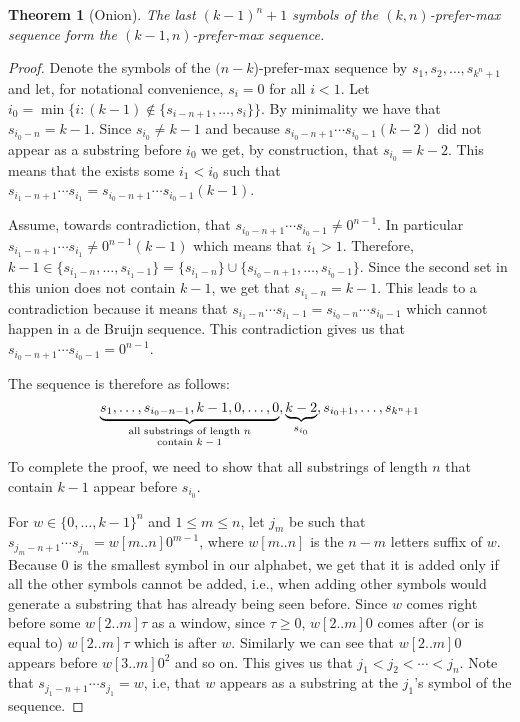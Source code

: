 \documentclass{article}
\newtheorem{theorem}{Theorem}
\theoremstyle{definition}
\begin{document}
\begin{theorem}[Onion]
	The last $(k-1)^n+1$ symbols of the $(k,n)$-prefer-max sequence form the $(k-1,n)$-prefer-max sequence.
\end{theorem}
\begin{proof}
	Denote the symbols of the $(n-k$)-prefer-max sequence by $s_1,s_2,\dots,s_{k^n+1}$ and let, for notational convenience, $s_i=0$ for all $i<1$. Let ${i_0} = \min\bigl\{i\colon (k-1) \notin \{s_{i-n+1},\dots,s_{i}\}\bigr\}$. 
	By minimality we have that $s_{{i_0}-n}=k-1$. Since $s_{i_0} \neq k-1$ and because $s_{{i_0}-n+1}\cdots s_{{i_0}-1} (k-2)$ did not appear as a substring before ${i_0}$ we get, by construction, that $s_{{i_0}}=k-2$. This means that the exists some ${i_1}<{i_0}$ such that $s_{{i_1}-n+1}\cdots s_{{i_1}} = s_{{i_0}-n+1}\cdots s_{{i_0}-1}(k-1)$.
	
	Assume, towards contradiction, that $s_{{i_0}-n+1}\cdots s_{{i_0}-1} \neq 0^{n-1}$. In particular $s_{{i_1}-n+1}\cdots s_{{i_1}} \neq 0^{n-1}(k-1)$ which means that ${i_1} > 1$. Therefore, $k-1  \in \{s_{{i_1}-n},\dots,s_{{i_1}-1}\}=\{s_{{i_1}-n}\} \cup \{s_{{i_0}-n+1},\dots,s_{{i_0}-1}\}$. Since the second set in this union does not contain $k-1$, we get that $s_{{i_1}-n}=k-1$. This leads to a contradiction because it means that $s_{{i_1}-n}\cdots s_{{i_1}-1} = s_{{i_0}-n}\cdots s_{{i_0}-1}$ which cannot happen in a de Bruijn sequence. This contradiction gives us that $s_{{i_0}-n+1}\cdots s_{{i_0}-1} = 0^{n-1}$.
	
	The sequence is therefore as follows:
	$$\underbrace{s_1,\dots,s_{i_0-n-1},k-1,{0,\dots,0}}_{\parbox{10 em}{\scriptsize \centering{all substrings of length $n$ contain $k-1$}}},\underbrace{k-2}_{s_{i_0}},s_{i_0+1},\dots,s_{k^n+1}$$
	To complete the proof, we need to show that all substrings of length $n$ that contain $k-1$ appear before $s_{i_0}$.
	
	For $w \in \{0,\dots,k-1\}^n$ and $1 \leq m \leq n$, let $j_m$ be such that $s_{j_m-n+1}\cdots s_{j_m} = w[m..n]0^{m-1}$, where $w[m..n]$ is the $n-m$ letters suffix of $w$. 
	Because $0$ is the smallest symbol in our alphabet, we get that it is added only if all the other symbols cannot be added, i.e., when adding other symbols would generate a substring that has already being seen before. 
	Since $w$ comes right before some $w[2..m]\tau$ as a window, since $\tau \geq 0$,  $w[2..m]0$ comes after (or is equal to) $w[2..m]\tau$ which is after $w$. Similarly we can see that $w[2..m]0$ appears before $w[3..m]0^2$ and so on.
	This gives us that $j_1 < j_2 < \cdots < j_n$. Note that $s_{j_1-n+1}\cdots s_{j_1}=w$, i.e, that $w$ appears as a substring at the $j_1$'s symbol of the sequence.
	

\end{proof}
\end{document}
